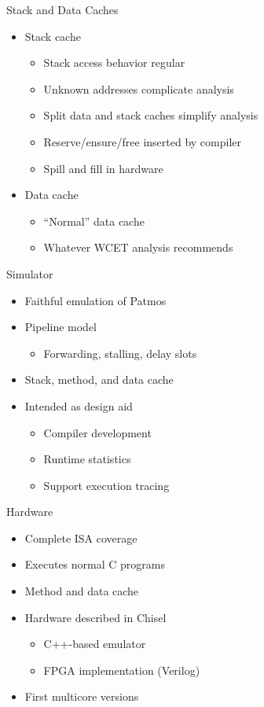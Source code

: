\documentclass[17pt]{beamer}
\begin{document}
\begin{frame}{Stack and Data Caches}
  \begin{itemize}
  \item Stack cache
    \begin{itemize}
    \item Stack access behavior regular
    \item Unknown addresses complicate analysis
    \item Split data and stack caches simplify analysis
    \item Reserve/ensure/free inserted by compiler
    \item Spill and fill in hardware
    \end{itemize}
  \item Data cache
    \begin{itemize}
    \item ``Normal'' data cache
    \item Whatever WCET analysis recommends
    \end{itemize}
  \end{itemize}
\end{frame}

\begin{frame}{Simulator}
  \begin{itemize}
  \item Faithful emulation of Patmos
  \item Pipeline model
    \begin{itemize}
    \item Forwarding, stalling, delay slots
    \end{itemize}
  \item Stack, method, and data cache
  \item Intended as design aid
    \begin{itemize}
    \item Compiler development
    \item Runtime statistics
    \item Support execution tracing
    \end{itemize}
  \end{itemize}  
\end{frame}

\begin{frame}{Hardware}
  \begin{itemize}
  \item Complete ISA coverage
  \item Executes normal C programs
  \item Method and data cache
  \item Hardware described in Chisel
    \begin{itemize}
    \item C++-based emulator
    \item FPGA implementation (Verilog)
    \end{itemize}
  \item First multicore versions
  \end{itemize}
\end{frame}
\end{document}
